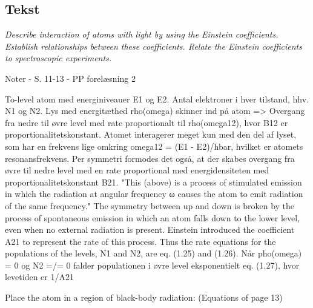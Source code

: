 \subsection{Tekst}

\emph{Describe interaction of atoms with light by using the Einstein coefficients. Establish relationships between these coefficients. Relate the Einstein coefficients to spectroscopic experiments.}

Noter
- S. 11-13
- PP forelæsning 2

To-level atom med energiniveauer E1 og E2. Antal elektroner i hver tilstand, hhv. N1 og N2.
Lys med energitæthed rho(omega) skinner ind på atom => Overgang fra nedre til øvre level med rate proportionalt til rho(omega12), hvor B12 er proportionalitetskonstant. Atomet interagerer meget kun med den del af lyset, som har en frekvens lige omkring omega12 = (E1 - E2)/hbar, hvilket er atomets resonansfrekvens.
Per symmetri formodes det også, at der skabes overgang fra øvre til nedre level med en rate proportional med energidensiteten med proportionalitetskonstant B21.
"This (above) is a process of stimulated emission in which the radiation
at angular frequency ω causes the atom to emit radiation of the same
frequency."
The symmetry between up and down is broken by the process of spontaneous emission in which an atom falls down to the lower level, even when no external radiation is present. Einstein introduced the coefficient A21 to represent the rate of this process. Thus the rate equations for the populations of the levels, N1 and N2, are eq. (1.25) and (1.26).
Når pho(omega) = 0 og N2 =/= 0 falder populationen i øvre level eksponentielt eq. (1.27), hvor levetiden er 1/A21

Place the atom in a region of black-body radiation: (Equations of page 13)